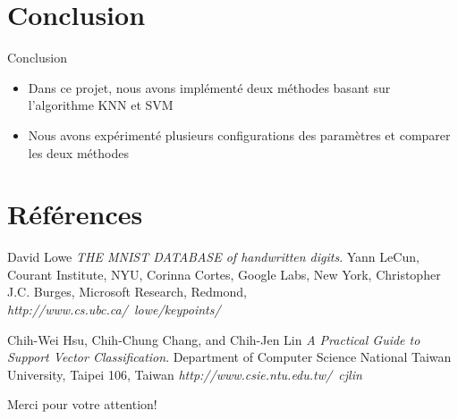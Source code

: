 \documentclass[12pt]{beamer}
\begin{document}
\section{Conclusion}
\begin{frame}{Conclusion}
\begin{itemize}
\item Dans ce projet, nous avons implémenté deux méthodes basant sur l'algorithme KNN et 
SVM
\item Nous avons expérimenté plusieurs configurations des paramètres et comparer les deux 
méthodes
\end{itemize}
\end{frame}

\section*{Références}

\begin{frame}
\begin{thebibliography}{9}
  David Lowe
  \emph{THE MNIST DATABASE of handwritten digits}.
  Yann LeCun, Courant Institute, NYU,
  Corinna Cortes, Google Labs, New York,
  Christopher J.C. Burges, Microsoft Research, Redmond,
  \emph{http://www.cs.ubc.ca/~lowe/keypoints/}
   
  Chih-Wei Hsu, Chih-Chung Chang, and Chih-Jen Lin
  \emph{A Practical Guide to Support Vector Classification}.
  Department of Computer Science
National Taiwan University, Taipei 106, Taiwan
  \emph{http://www.csie.ntu.edu.tw/~cjlin}
 
\end{thebibliography}
\end{frame}
\begin{frame}
 \Huge Merci pour votre attention!
\end{frame}
\end{document}

